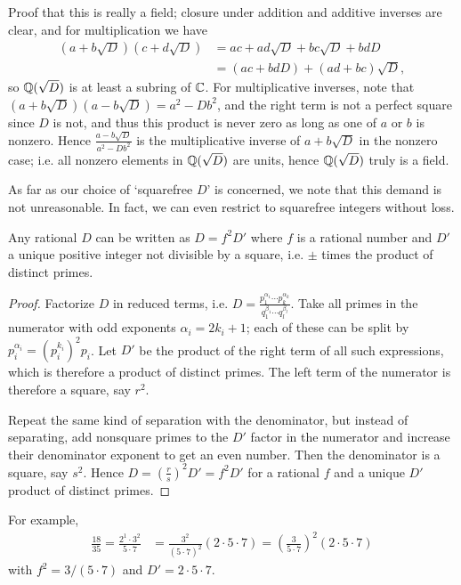 Proof that this is really a field; closure under addition and additive inverses are clear, and for multiplication we have
\begin{align*}
	(a+b\sqrt{D})(c+d\sqrt{D}) &= ac + ad\sqrt{D} + bc\sqrt{D} + bdD\\
		&= (ac+bdD) + (ad+bc)\sqrt{D},
\end{align*}
so $\mathbb{Q}(\sqrt{D})$ is at least a subring of $\mathbb{C}$. For multiplicative inverses, note that $(a+b\sqrt{D})(a-b\sqrt{D}) = a^2-Db^2$, and the right term is not a perfect square since $D$ is not, and thus this product is never zero as long as one of $a$ or $b$ is nonzero. Hence $\frac{a-b\sqrt{D}}{a^2-Db^2}$ is the multiplicative inverse of $a+b\sqrt{D}$ in the nonzero case; i.e. all nonzero elements in $\mathbb{Q}(\sqrt{D})$ are units, hence $\mathbb{Q}(\sqrt{D})$ truly is a field.

As far as our choice of `squarefree $D$' is concerned, we note that this demand is not unreasonable. In fact, we can even restrict to squarefree integers without loss.

\begin{proposition}
	Any rational $D$ can be written as $D=f^2D'$ where $f$ is a rational number and $D'$ a unique positive integer not divisible by a square, i.e. $\pm$ times the product of distinct primes.
\end{proposition}
\begin{proof}
	Factorize $D$ in reduced terms, i.e. $D=\frac{p_1^{\alpha_1} \cdots p_k^{\alpha_k}}{q_1^{\beta_1} \cdots q_l^{\beta_l}}$. Take all primes in the numerator with odd exponents $\alpha_i = 2k_i + 1$; each of these can be split by $p_i^{\alpha_i} = (p_i^{k_i})^2 p_i$. Let $D'$ be the product of the right term of all such expressions, which is therefore a product of distinct primes. The left term of the numerator is therefore a square, say $r^2$.

	Repeat the same kind of separation with the denominator, but instead of separating, add nonsquare primes to the $D'$ factor in the numerator and increase their denominator exponent to get an even number. Then the denominator is a square, say $s^2$. Hence $D=\left(\frac{r}{s}\right)^2 D'= f^2 D'$ for a rational $f$ and a unique $D'$ product of distinct primes.
\end{proof}

For example,
\begin{align*}
	\frac{18}{35} = \frac{2^1 \cdot 3^2}{5 \cdot 7} &= \frac{3^2}{(5\cdot 7)^2} (2\cdot 5\cdot 7) = \left(\frac{3}{5\cdot 7}\right)^2 (2\cdot 5\cdot 7)
\end{align*}
with $f^2=3/(5\cdot 7)$ and $D'=2\cdot 5\cdot 7$.

